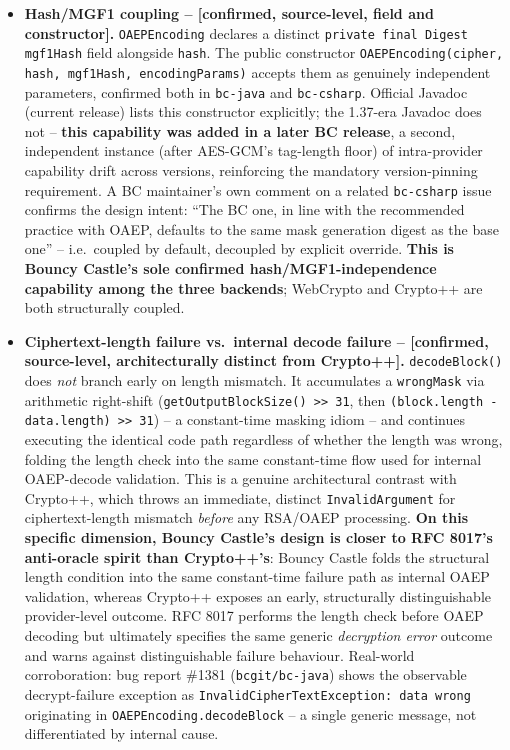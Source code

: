 \documentclass[11pt,a4paper]{article}
\begin{document}
\begin{itemize}
\item \textbf{Hash/MGF1 coupling -- [confirmed, source-level, field and constructor].} \texttt{OAEPEncoding} declares a distinct \texttt{private final Digest mgf1Hash} field alongside \texttt{hash}. The public constructor \texttt{OAEPEncoding(cipher, hash, mgf1Hash, encodingParams)} accepts them as genuinely independent parameters, confirmed both in \texttt{bc-java} and \texttt{bc-csharp}. Official Javadoc (current release) lists this constructor explicitly; the 1.37-era Javadoc does not -- \textbf{this capability was added in a later BC release}, a second, independent instance (after AES-GCM's tag-length floor) of intra-provider capability drift across versions, reinforcing the mandatory version-pinning requirement. A BC maintainer's own comment on a related \texttt{bc-csharp} issue confirms the design intent: ``The BC one, in line with the recommended practice with OAEP, defaults to the same mask generation digest as the base one'' -- i.e.\ coupled by default, decoupled by explicit override. \textbf{This is Bouncy Castle's sole confirmed hash/MGF1-independence capability among the three backends}; WebCrypto and Crypto++ are both structurally coupled.
\item \textbf{Ciphertext-length failure vs.\ internal decode failure -- [confirmed, source-level, architecturally distinct from Crypto++].} \texttt{decodeBlock()} does \emph{not} branch early on length mismatch. It accumulates a \texttt{wrongMask} via arithmetic right-shift (\texttt{getOutputBlockSize() >> 31}, then \texttt{(block.length - data.length) >> 31}) -- a constant-time masking idiom -- and continues executing the identical code path regardless of whether the length was wrong, folding the length check into the same constant-time flow used for internal OAEP-decode validation. This is a genuine architectural contrast with Crypto++, which throws an immediate, distinct \texttt{InvalidArgument} for ciphertext-length mismatch \emph{before} any RSA/OAEP processing. \textbf{On this specific dimension, Bouncy Castle's design is closer to RFC 8017's anti-oracle spirit than Crypto++'s}: Bouncy Castle folds the structural length condition into the same constant-time failure path as internal OAEP validation, whereas Crypto++ exposes an early, structurally distinguishable provider-level outcome. RFC 8017 performs the length check before OAEP decoding but ultimately specifies the same generic \emph{decryption error} outcome and warns against distinguishable failure behaviour. Real-world corroboration: bug report \#1381 (\texttt{bcgit/bc-java}) shows the observable decrypt-failure exception as \texttt{InvalidCipherTextException: data wrong} originating in \texttt{OAEPEncoding.decodeBlock} -- a single generic message, not differentiated by internal cause.

\end{itemize}
\end{document}
